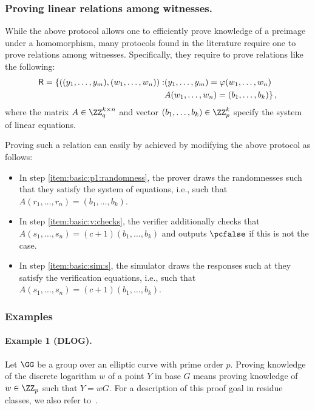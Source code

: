 \documentclass[runningheads]{llncs}
\begin{document}
\subsubsection{Proving linear relations among witnesses.}

  While the above protocol allows one to efficiently prove knowledge of a preimage under a homomorphism, many protocols found in the literature require one to prove relations among witnesses.
  Specifically, they require to prove relations like the following:
\begin{align*}
\mathsf{R}=\{((y_1,\dots,y_m),(w_1,\dots,w_n)) :& (y_1,\dots,y_m)=\varphi(w_1,\dots,w_n) \\
                                               & A(w_1,\dots,w_n) = (b_1,\dots,b_k)\}\,,
\end{align*}
where the matrix $A\in\ZZ_q^{k\times n}$ and vector $(b_1,\dots,b_k)\in\ZZ_p^k$ specify the system of linear equations.

Proving such a relation can easily by achieved by modifying the above protocol as follows:
\begin{itemize}
  \item
    In step \ref{item:basic:p1:randomness}, the prover draws the randomnesses such that they satisfy the system of equations, i.e., such that $A(r_1,\dots,r_n)=(b_1,\dots,b_k)$.
  \item
    In step \ref{item:basic:v:checks}, the verifier additionally checks that $A(s_1,\dots,s_n)=(c+1)(b_1,\dots,b_k)$ and outputs $\reject$ if this is not the case.
  \item
    In step \ref{item:basic:sim:s}, the simulator draws the responses such at they satisfy the verification equations, i.e., such that $A(s_1,\dots,s_n)=(c+1)(b_1,\dots,b_k)$.
\end{itemize}




\subsubsection{Examples}

\paragraph{Example 1 (DLOG).}
Let $\GG$ be a group over an elliptic curve with prime order $p$.
Proving knowledge of the discrete logarithm $w$ of a point $Y$ in base $G$ means proving knowledge of $w\in\ZZ_p$ such that $Y=wG$.
For a description of this proof goal in residue classes, we also refer to~\cite[1.4.1]{zkproof-reference}.
\end{document}
